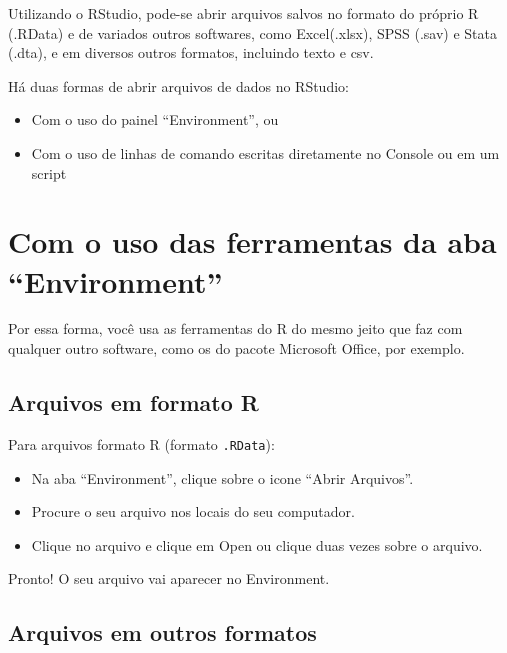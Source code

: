 \documentclass[
  10pt,
  brazil,
  a4paper,
  twoside, notitlepage, openright]{book}
\providecommand{\tightlist}{%
  \setlength{\itemsep}{0pt}\setlength{\parskip}{0pt}}
\begin{document}
Utilizando o RStudio, pode-se abrir arquivos salvos no formato do próprio R (.RData) e de variados outros softwares, como Excel(.xlsx), SPSS (.sav) e Stata (.dta), e em diversos outros formatos, incluindo texto e csv.

Há duas formas de abrir arquivos de dados no RStudio:

\begin{itemize}
\tightlist
\item
  Com o uso do painel ``Environment'', ou
\item
  Com o uso de linhas de comando escritas diretamente no Console ou em um script
\end{itemize}

\hypertarget{com-o-uso-das-ferramentas-da-aba-environment}{%
\section{Com o uso das ferramentas da aba ``Environment''}\label{com-o-uso-das-ferramentas-da-aba-environment}}

Por essa forma, você usa as ferramentas do R do mesmo jeito que faz com qualquer outro software, como os do pacote Microsoft Office, por exemplo.

\hypertarget{arquivos-em-formato-r}{%
\subsection{Arquivos em formato R}\label{arquivos-em-formato-r}}

Para arquivos formato R (formato \texttt{.RData}):

\begin{itemize}
\tightlist
\item
  Na aba ``Environment'', clique sobre o icone ``Abrir Arquivos''.\\
\item
  Procure o seu arquivo nos locais do seu computador.\\
\item
  Clique no arquivo e clique em Open ou clique duas vezes sobre o arquivo.
\end{itemize}

Pronto! O seu arquivo vai aparecer no Environment.

\hypertarget{arquivos-em-outros-formatos}{%
\subsection{Arquivos em outros formatos}\label{arquivos-em-outros-formatos}}
\end{document}
